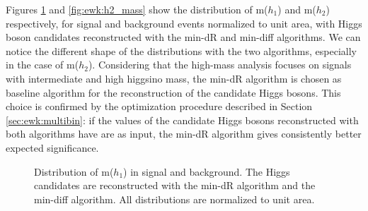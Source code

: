 Figures \ref{fig:ewk:h1_mass} and \ref{fig:ewk:h2_mass} show the distribution of m($h_1$) and m($h_2$) 
respectively, for signal and background events normalized to unit area, 
with Higgs boson candidates reconstructed with the min-dR and min-diff algorithms. 
We can notice the different shape of the distributions with the two algorithms, especially in the case of m($h_2$). 
Considering that the high-mass analysis focuses on signals with intermediate and high higgsino mass, 
the min-dR algorithm is chosen as baseline algorithm for the reconstruction of the candidate Higgs bosons. 
This choice is confirmed by the optimization procedure described in Section \ref{sec:ewk:multibin}: 
if  the values of the candidate Higgs bosons reconstructed with both algorithms have are as input, 
the min-dR algorithm gives consistently better expected significance.


\begin{figure}[htbp]
\centering 
{}
\caption{Distribution of m($h_1$) in signal and background. The Higgs candidates are reconstructed with 
 the min-dR algorithm and 
 the min-diff algorithm. All distributions are normalized to unit area.}
\label{fig:ewk:h1_mass}
\end{figure}

